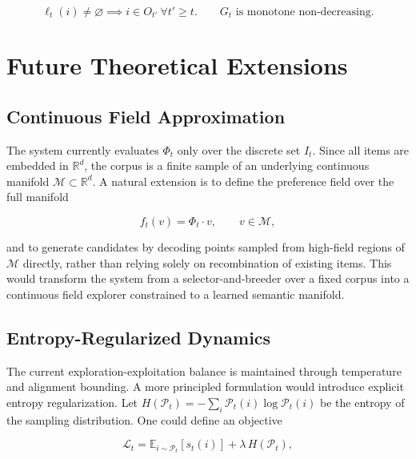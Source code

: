 \documentclass[12pt, a4paper]{article}
\theoremstyle{definition}
\begin{document}
\begin{equation}
\ell_t(i) \neq \varnothing \implies i \in O_{t'}\ \forall t' \ge t. \qquad G_t \text{ is monotone non-decreasing.}
\end{equation}

\section{Future Theoretical Extensions}

\subsection{Continuous Field Approximation}

The system currently evaluates $\Phi_t$ only over the discrete set $I_t$. Since all items are embedded in $\mathbb{R}^d$, the corpus is a finite sample of an underlying continuous manifold $\mathcal{M} \subset \mathbb{R}^d$. A natural extension is to define the preference field over the full manifold

\begin{equation}
f_t(v) = \Phi_t \cdot v, \qquad v \in \mathcal{M},
\end{equation}

and to generate candidates by decoding points sampled from high-field regions of $\mathcal{M}$ directly, rather than relying solely on recombination of existing items. This would transform the system from a selector-and-breeder over a fixed corpus into a continuous field explorer constrained to a learned semantic manifold.

\subsection{Entropy-Regularized Dynamics}

The current exploration-exploitation balance is maintained through temperature and alignment bounding. A more principled formulation would introduce explicit entropy regularization. Let $H(\mathcal{P}_t) = -\sum_i \mathcal{P}_t(i)\log \mathcal{P}_t(i)$ be the entropy of the sampling distribution. One could define an objective

\begin{equation}
\mathcal{L}_t = \mathbb{E}_{i \sim \mathcal{P}_t}[s_t(i)] + \lambda\, H(\mathcal{P}_t),
\end{equation}
\end{document}
